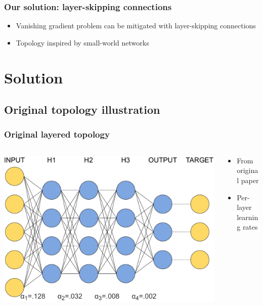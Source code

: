\documentclass[pdf]{beamer}
\begin{document}
\begin{frame}
\frametitle{Our solution: layer-skipping connections}
\begin{itemize}
	\item<1-> Vanishing gradient problem can be mitigated with layer-skipping connections
	\item<2-> Topology inspired by small-world networks
\end{itemize}
\end{frame}

\section{Solution}

\subsection{Original topology illustration}
\begin{frame}
	\frametitle{Original layered topology}
	\begin{columns}
	\begin{column}{.6\textwidth}
		\begin{center}
		\includegraphics[width=\textwidth]{figures/basic_topology_illustration.pdf}
		\end{center}
	\end{column}
	\begin{column}{.4\textwidth}
		\begin{itemize}
			\item From original paper
			\item Per-layer learning rates
		\end{itemize}
	\end{column}
	\end{columns}
\end{frame}
\end{document}
